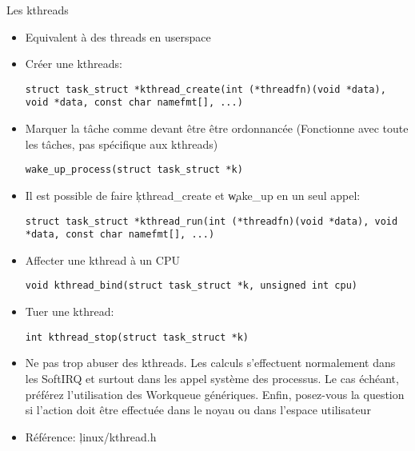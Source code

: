 \begin{frame}[fragile=singleslide]{Les kthreads}
  \begin{itemize}
  \item Equivalent à des threads en userspace
  \item Créer une kthreads:
    \begin{lstlisting} 
struct task_struct *kthread_create(int (*threadfn)(void *data), void *data, const char namefmt[], ...)
    \end{lstlisting} 
  \item  Marquer   la  tâche   comme  devant  être   être  ordonnancée
    (Fonctionne avec toute les tâches, pas spécifique aux kthreads)
    \begin{lstlisting} 
wake_up_process(struct task_struct *k)
    \end{lstlisting} 
  \item Il est possible de faire \c{kthread_create} et \c{wake_up} en
    un seul appel:
    \begin{lstlisting} 
struct task_struct *kthread_run(int (*threadfn)(void *data), void *data, const char namefmt[], ...)
    \end{lstlisting}
  \item Affecter une kthread à un CPU
    \begin{lstlisting}
void kthread_bind(struct task_struct *k, unsigned int cpu)
    \end{lstlisting} 
  \item Tuer une kthread:
    \begin{lstlisting} 
int kthread_stop(struct task_struct *k)
    \end{lstlisting} 
  \item  Ne pas  trop abuser  des kthreads.  Les  calculs s'effectuent
    normalement dans les SoftIRQ et surtout dans les appel système des
    processus.  Le cas échéant,  préférez l'utilisation  des Workqueue
    génériques. Enfin,  posez-vous la  question si l'action  doit être
    effectuée dans le noyau ou dans l'espace utilisateur
  \item Référence: \c{linux/kthread.h}
  \end{itemize} 
\end{frame} 

